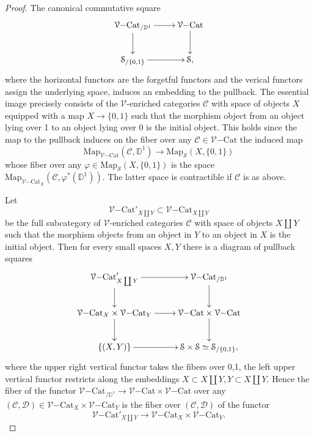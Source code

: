 \documentclass[10pt,oneside]{article}
\numberwithin{equation}{section} %
\numberwithin{figure}{section} %
\theoremstyle{plain}
\theoremstyle{definition}
\newcommand{\bD}{{\mathbb D}}
\newcommand{\mC}{{\mathcal C}}
\newcommand{\mD}{{\mathcal D}}
\newcommand{\mS}{{\mathcal S}}
\newcommand{\mV}{{\mathcal V}}
\newcommand{\Cat}{\mathrm{Cat}}
\newcommand{\Map}{{\mathrm{Map}}}
\begin{document}
\begin{proof}

The canonical commutative square
$$\begin{xy}
\xymatrix{
{\mV\mathrm{-}\Cat}_{/\bD^1} \ar[d]^{} \ar[r]
& {\mV\mathrm{-}\Cat} \ar[d]
\\ 
\mS_{/\{0,1\}} \ar[r]& \mS,}
\end{xy}$$
where the horizontal functors are the forgetful functors and the verical functors assign the underlying space,
induces an embedding to the pullback. The essential image
precisely consists of the $\mV$-enriched categories $\mC$ with space of objects $X$ equipped with a map $X \to \{0,1\}$
such that the morphism object from an object lying over 1 to an object lying over 0 is the initial object.
This holds since the map to the pullback induces on the fiber over any $\mC \in {\mV\mathrm{-}\Cat}$ the induced map
$$\Map_{{\mV\mathrm{-}\Cat}}(\mC, \bD^1) \to \Map_\mS(X,\{0,1\})$$ whose fiber over any $\varphi\in  \Map_\mS(X,\{0,1\})$ is the space
$\Map_{{\mV\mathrm{-}\Cat}_X}(\mC, \varphi^*(\bD^1)). $
The latter space is contractible if $\mC$ is as above.

Let 
$$ {\mV\mathrm{-}\Cat}'_{X \coprod Y} \subset {\mV\mathrm{-}\Cat}_{X \coprod Y}$$
be the full subcategory of $\mV$-enriched categories 
$\mC$ with space of objects $X \coprod Y$ such that
the morphism objects from an object in $Y$ to an object in $X$ is the initial object.
Then for every small spaces $X,Y$ there is a diagram of pullback squares
$$\begin{xy}
\xymatrix{
{\mV\mathrm{-}\Cat}'_{X \coprod Y} \ar[d]^{} \ar[r]
& {\mV\mathrm{-}\Cat}_{/\bD^1} \ar[d]
\\ 
{\mV\mathrm{-}\Cat}_{X} \times {\mV\mathrm{-}\Cat}_{Y} \ar[r] \ar[d] &  {\mV\mathrm{-}\Cat} \times {\mV\mathrm{-}\Cat}\ar[d]
\\ \{(X,Y)\} \ar[r]& \mS \times \mS \simeq \mS_{/\{0,1\}}
,}
\end{xy}$$
where the upper right vertical functor takes the fibers over 0,1, the left upper vertical functor restricts along the embeddings $X \subset X \coprod Y, Y \subset X \coprod Y$.
Hence the fiber of the functor $ {\mV\mathrm{-}\Cat}_{/\bD^1} \to {\mV\mathrm{-}\Cat} \times {\mV\mathrm{-}\Cat}$ over any $(\mC,\mD) \in {\mV\mathrm{-}\Cat}_X \times {\mV\mathrm{-}\Cat}_Y$
is the fiber over $(\mC,\mD)$ of the functor $$ {\mV\mathrm{-}\Cat}'_{X \coprod Y} \to {\mV\mathrm{-}\Cat}_{X} \times {\mV\mathrm{-}\Cat}_{Y}. $$


\end{proof}
\end{document}
